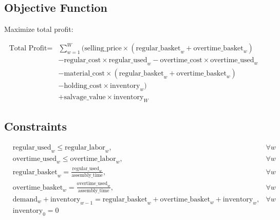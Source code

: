 \documentclass{article}
\begin{document}
\subsection*{Objective Function}

Maximize total profit:

\begin{align*}
  \text{Total Profit} = & \sum_{w=1}^{W} (\text{selling\_price} \times (\text{regular\_basket}_w + \text{overtime\_basket}_w) \\
  & - \text{regular\_cost} \times \text{regular\_used}_w - \text{overtime\_cost} \times \text{overtime\_used}_w \\
  & - \text{material\_cost} \times (\text{regular\_basket}_w + \text{overtime\_basket}_w) \\
  & - \text{holding\_cost} \times \text{inventory}_w) \\
  & + \text{salvage\_value} \times \text{inventory}_W
\end{align*}

\subsection*{Constraints}

\begin{align*}
  & \text{regular\_used}_w \leq \text{regular\_labor}_w, & \forall w \\
  & \text{overtime\_used}_w \leq \text{overtime\_labor}_w, & \forall w \\
  & \text{regular\_basket}_w = \frac{\text{regular\_used}_w}{\text{assembly\_time}}, & \forall w \\
  & \text{overtime\_basket}_w = \frac{\text{overtime\_used}_w}{\text{assembly\_time}}, & \forall w \\
  & \text{demand}_w + \text{inventory}_{w-1} = \text{regular\_basket}_w + \text{overtime\_basket}_w + \text{inventory}_w, & \forall w \\
  & \text{inventory}_0 = 0
\end{align*}
\end{document}
